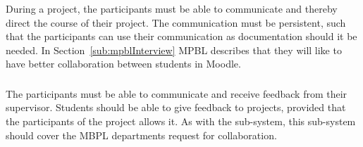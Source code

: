 \subsubsection{\blackboardgroup{}} %
During a project, the participants must be able to communicate and thereby direct the course of their project.%
The communication must be persistent, such that the participants can use their communication as documentation should it be needed.%
In Section~\ref{sub:mpblInterview} MPBL describes that they will like to have better collaboration between students in Moodle.

\subsubsection{\supervisorgroup{}} %
The participants must be able to communicate and receive feedback from their supervisor.
Students should be able to give feedback to projects, provided that the participants of the project allows it.
As with the \blackboardgroup{} sub-system, this sub-system should cover the MBPL departments request for collaboration.


